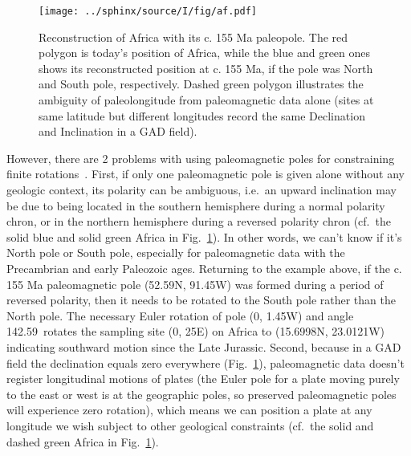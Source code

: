 \begin{figure}
  \centering
    \texttt{[image: ../sphinx/source/I/fig/af.pdf]}
  \captionsetup{width=.95\textwidth}
  \caption[The hemispheric ambiguity and absolute paleolongitude indeterminacy
  with a single paleomagnetic pole (paleopole)]{Reconstruction of Africa with
  its c. 155 Ma paleopole. The red polygon is today's position of Africa, while
  the blue and green ones shows its reconstructed position at c. 155 Ma, if the
  pole was North and South pole, respectively. Dashed green polygon illustrates
  the ambiguity of paleolongitude from paleomagnetic data alone (sites at same
  latitude but different longitudes record the same Declination and Inclination
  in a GAD field).}\label{Fig:chap_intro_reconstructpole}
\end{figure}

However, there are 2 problems with using paleomagnetic poles for constraining
finite rotations~\citep{T19}. First, if only one paleomagnetic pole is
given alone without any geologic context, its polarity can be ambiguous, i.e.\
an upward inclination may be due to being located in the southern hemisphere
during a normal polarity chron, or in the northern hemisphere during a reversed
polarity chron (cf.\ the solid blue and solid green Africa in Fig.~\ref{Fig:chap_intro_reconstructpole}). In other words, we can't know if it's North pole
or South pole, especially for paleomagnetic data with the Precambrian and early
Paleozoic ages. Returning to the example above, if the c. 155 Ma paleomagnetic
pole (52.59\degree{}N, 91.45\degree{}W) was formed during a period of reversed polarity, then
it needs to be rotated to the South pole rather than the North pole. The
necessary Euler rotation of pole (0\degree, 1.45\degree{}W) and angle
142.59\degree\ rotates the sampling site (0\degree, 25\degree{}E) on Africa to
(15.6998\degree{}N, 23.0121\degree{}W) indicating
southward motion since the Late Jurassic. Second, because in a GAD field the
declination equals zero everywhere (Fig.~\ref{Fig:chap_intro_reconstructpole}),
paleomagnetic data doesn't register longitudinal motions of plates (the Euler
pole for a plate moving purely to the east or west is at the geographic poles,
so preserved paleomagnetic poles will experience zero rotation), which means we
can position a plate at any longitude we wish subject to other geological
constraints (cf.\ the solid and dashed green Africa in Fig.~\ref{Fig:chap_intro_reconstructpole}).

